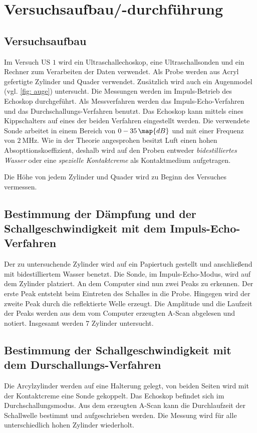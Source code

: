 \section{Versuchsaufbau/-durchführung}

\subsection{Versuchsaufbau}
Im Versuch US $1$ wird ein Ultraschallechoskop, eine Ultraschallsonden und ein Rechner %
zum Verarbeiten der Daten verwendet.
Als Probe werden aus Acryl gefertigte Zylinder und Quader verwendet.
Zusätzlich wird auch ein Augenmodel (vgl. \ref{fig: auge}) untersucht. %
Die Messungen werden im Impuls-Betrieb des Echoskop durchgeführt. Als Messverfahren werden
das Impuls-Echo-Verfahren und das Durchschallungs-Verfahren benutzt. Das Echoskop kann mittels
eines Kippschalters auf eines der beiden Verfahren eingestellt werden.
Die verwendete Sonde arbeitet in einem Bereich von $0-35\,\map{dB}$ und mit einer
Frequenz von $\SI{2}{\mega\hertz}$.
Wie in der Theorie angesprohen besitzt Luft einen hohen Absopttionskoeffizient, deshalb wird %
auf den Proben entweder \emph{bidestilliertes Wasser} oder eine \emph{spezielle Kontaktcreme} %
als Kontaktmedium aufgetragen.


Die Höhe von jedem Zylinder und Quader wird zu  Beginn des Versuches vermessen. %
\subsection{Bestimmung der Dämpfung und der Schallgeschwindigkeit mit dem Impuls-Echo-Verfahren}
Der zu untersuchende Zylinder wird auf ein Papiertuch gestellt und anschließend
mit bidestilliertem Wasser benetzt. Die Sonde, im Impuls-Echo-Modus, wird auf dem
Zylinder platziert. An dem Computer sind nun zwei Peaks zu erkennen. Der erste Peak
entsteht beim Eintreten des Schalles in die Probe. Hingegen wird der zweite Peak
durch die reflektierte Welle erzeugt. Die Amplitude und die Laufzeit der Peaks
werden aus dem vom Computer erzeugten A-Scan abgelesen und notiert.
Insgesamt werden $7$ Zylinder untersucht.

\subsection{Bestimmung der Schallgeschwindigkeit mit dem Durschallungs-Verfahren}

Die Arcylzylinder werden auf eine Halterung gelegt, von beiden Seiten wird
mit der Kontaktcreme eine Sonde gekoppelt. Das Echoskop befindet sich im
Durchschallungsmodus. Aus dem erzeugten A-Scan kann die Durchlaufzeit der
Schallwelle bestimmt und aufgeschrieben werden. Die Messung wird für alle unterschiedlich
hohen Zylinder wiederholt.


